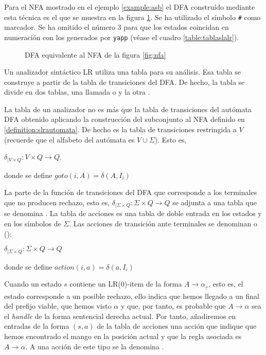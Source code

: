 Para el NFA mostrado en el ejemplo \ref{example:asb} el DFA construído mediante esta
técnica es el que se muestra en la figura \ref{fig:dfa}. Se ha utilizado el símbolo
\verb|#| como marcador. Se ha omitido el número 3 para que los estados coincidan
en numeración con los generados por \verb|yapp| (véase el cuadro
\ref{table:tablaslalr}).

\begin{center}
\begin{figure}
\caption{DFA equivalente al NFA de la figura \ref{fig:nfa}}
\label{fig:dfa}
\end{figure}
\end{center}

Un analizador sintáctico LR utiliza una tabla para su análisis.
Esa tabla se construye a partir de la tabla de transiciones del DFA.
De hecho, la tabla se divide en dos tablas, una llamada 
 o  y la otra
.

La tabla  de un analizador 
no es más que la tabla de transiciones del autómata DFA 
obtenido aplicando la construcción del subconjunto al NFA
definido en \ref{definition:slrautomata}. De hecho es la tabla
de transiciones restringida a $V$ (recuerde que el alfabeto del
autómata es $V \cup \Sigma$).
Esto es, 

\begin{center}
$\delta_{| V \times Q} :  V \times Q \rightarrow Q$. 

donde se define $goto(i, A) = \delta(A,I_i)$
\end{center}

La parte de la función de transiciones
del DFA que corresponde a los terminales que no producen rechazo, 
esto es, $\delta_{| \Sigma \times Q} :  \Sigma \times Q \rightarrow Q$
se adjunta a una tabla que se denomina .
La tabla de acciones es una tabla de doble entrada en los estados
y en los símbolos de $\Sigma$.
Las acciones de transición ante terminales 
se denominan  o ():

\begin{center}
$\delta_{| \Sigma \times Q} :  \Sigma \times Q \rightarrow Q$

donde se define $action(i, a) = \delta(a,I_i)$
\end{center}

Cuando un estado $s$ contiene un LR(0)-item de la forma 
$A \rightarrow \alpha_\uparrow$, 
esto es, el estado corresponde a un posible rechazo,
ello indica que hemos llegado a un final del prefijo viable, que hemos
visto $\alpha$ y que, por tanto, es probable que $A \rightarrow \alpha$
sea el \emph{handle} de la forma sentencial derecha actual. Por tanto,
añadiremos en entradas de la forma $(s,a)$ de la tabla de acciones 
una acción que indique que hemos encontrado el mango en la 
posición actual y que la regla asociada es $A \rightarrow \alpha$.
A una acción de este tipo se la denomina .

